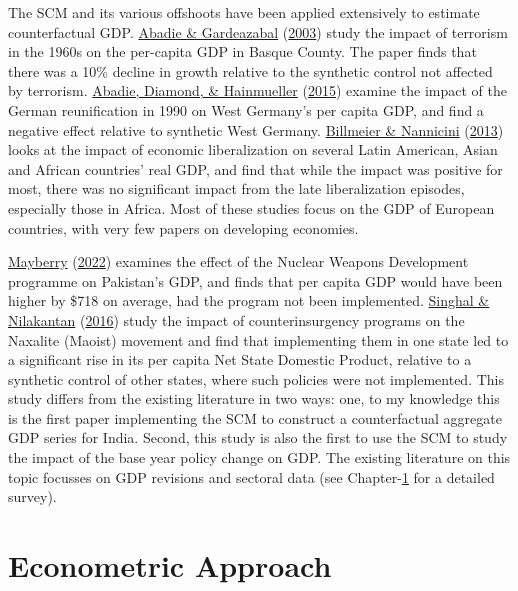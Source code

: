\documentclass[12pt,nobind, a4paper]{reedthesis}
\begin{document}
 The SCM and its various offshoots have been applied extensively to estimate counterfactual GDP. \protect\hyperlink{ref-abadie_economic_2003}{Abadie \& Gardeazabal} (\protect\hyperlink{ref-abadie_economic_2003}{2003}) study the impact of terrorism in the 1960s on the per-capita GDP in Basque County. The paper finds that there was a 10\% decline in growth relative to the synthetic control not affected by terrorism. \protect\hyperlink{ref-abadie_comparative_2015}{Abadie, Diamond, \& Hainmueller} (\protect\hyperlink{ref-abadie_comparative_2015}{2015}) examine the impact of the German reunification in 1990 on West Germany's per capita GDP, and find a negative effect relative to synthetic West Germany. \protect\hyperlink{ref-billmeier_assessing_2013}{Billmeier \& Nannicini} (\protect\hyperlink{ref-billmeier_assessing_2013}{2013}) looks at the impact of economic liberalization on several Latin American, Asian and African countries' real GDP, and find that while the impact was positive for most, there was no significant impact from the late liberalization episodes, especially those in Africa. Most of these studies focus on the GDP of European countries, with very few papers on developing economies.
 \linebreak

 \protect\hyperlink{ref-mayberry_economic_2022}{Mayberry} (\protect\hyperlink{ref-mayberry_economic_2022}{2022}) examines the effect of the Nuclear Weapons Development programme on Pakistan's GDP, and finds that per capita GDP would have been higher by \$718 on average, had the program not been implemented. \protect\hyperlink{ref-singhal_economic_2016}{Singhal \& Nilakantan} (\protect\hyperlink{ref-singhal_economic_2016}{2016}) study the impact of counterinsurgency programs on the Naxalite (Maoist) movement and find that implementing them in one state led to a significant rise in its per capita Net State Domestic Product, relative to a synthetic control of other states, where such policies were not implemented. This study differs from the existing literature in two ways: one, to my knowledge this is the first paper implementing the SCM to construct a counterfactual aggregate GDP series for India. Second, this study is also the first to use the SCM to study the impact of the base year policy change on GDP. The existing literature on this topic focusses on GDP revisions and sectoral data (see Chapter-\href{ch1}{1} for a detailed survey).

 \hypertarget{ec}{%
 \section{Econometric Approach}\label{ec}}
\end{document}
